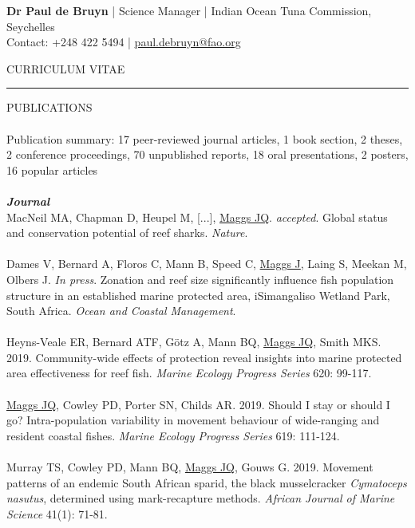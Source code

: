 \documentclass[10pt,a4paper]{article}
\begin{document}
\noindent
\textbf{Dr Paul de Bruyn} | Science Manager | Indian Ocean Tuna Commission, Seychelles\\
Contact: +248 422 5494 | \href{mailto:paul.debruyn@fao.org}{paul.debruyn@fao.org}\\
\newpage
\begin{center}
\color{gray}CURRICULUM VITAE\\
\end{center}
\hrule
\vspace{6pt}
\noindent
PUBLICATIONS\\
\\
Publication summary: 17 peer-reviewed journal articles, 1 book section, 2 theses, 2 conference proceedings, 70 unpublished reports, 18 oral presentations, 2 posters, 16 popular articles\\ 
\\
\textit{\textbf{Journal}}\\
\noindent
MacNeil MA, Chapman D, Heupel M, [...], \underline{Maggs JQ}. \textit{accepted}. Global status and conservation potential of reef sharks. \textit{Nature}.\\
\\
Dames V, Bernard A, Floros C, Mann B, Speed C, \underline{Maggs J}, Laing S, Meekan M, Olbers J. \textit{In press}. Zonation and reef size significantly influence fish population structure in an established marine protected area, iSimangaliso Wetland Park, South Africa. \textit{Ocean and Coastal Management}.\\
\\
Heyns-Veale ER, Bernard ATF, G\"otz A, Mann BQ, \underline{Maggs JQ}, Smith MKS. 2019. Community-wide effects of protection reveal insights into marine protected area effectiveness for reef fish. \textit{Marine Ecology Progress Series} 620: 99-117.\\
\\
\underline{Maggs JQ}, Cowley PD, Porter SN, Childs AR. 2019. Should I stay or should I go? Intra-population variability in movement behaviour of wide-ranging and resident coastal fishes. \textit{Marine Ecology Progress Series} 619: 111-124.\\
\\ 
Murray TS, Cowley PD, Mann BQ, \underline{Maggs JQ}, Gouws G. 2019. Movement patterns of an endemic South African sparid, the black musselcracker \textit{Cymatoceps nasutus}, determined using mark-recapture methods. \textit{African Journal of Marine Science} 41(1): 71-81.\\
\\  
\end{document}
